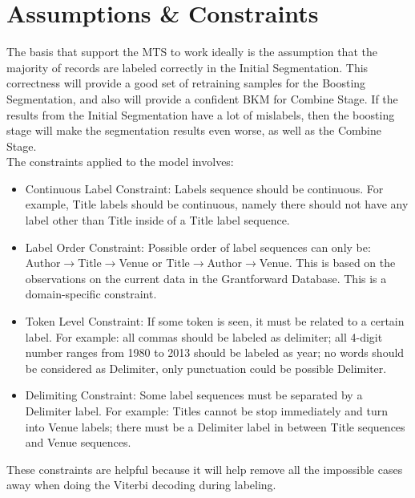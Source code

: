 \documentclass[11pt]{article}
\begin{document}
\section{Assumptions \& Constraints}
The basis that support the MTS to work ideally is the assumption that the majority of records are labeled correctly in the Initial Segmentation. This correctness will provide a good set of retraining samples for the Boosting Segmentation, and also will provide a confident BKM for Combine Stage. If the results from the Initial Segmentation have a lot of mislabels, then the boosting stage will make the segmentation results even worse, as well as the Combine Stage. \\

The constraints applied to the model involves:
\begin{itemize}
\item Continuous Label Constraint: Labels sequence should be continuous. For example, Title labels should be continuous, namely there should not have any label other than Title inside of a Title label sequence. 

\item Label Order Constraint: Possible order of label sequences can only be:\\
Author$\rightarrow$Title$\rightarrow$Venue or Title$\rightarrow$Author$\rightarrow$Venue. This is based on the observations on the current data in the Grantforward Database. This is a domain-specific constraint. 

\item Token Level Constraint: If some token is seen, it must be related to a certain label. For example: all commas should be labeled as delimiter; all 4-digit number ranges from 1980 to 2013 should be labeled as year; no words should be considered as Delimiter, only punctuation could be possible Delimiter.

\item Delimiting Constraint: Some label sequences must be separated by a Delimiter label. For example: Titles cannot be stop immediately and turn into Venue labels; there must be a Delimiter label in between Title sequences and Venue sequences. 

\end{itemize}
These constraints are helpful because it will help remove all the impossible cases away when doing the Viterbi decoding during labeling.
\end{document}
